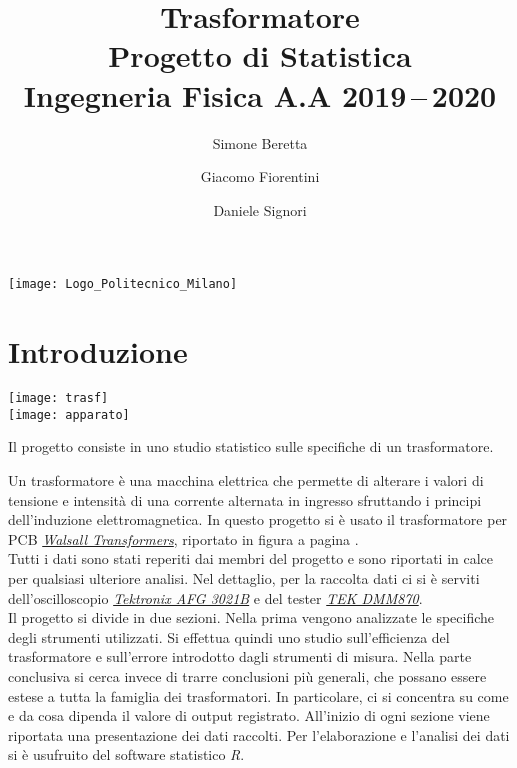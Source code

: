 \documentclass[a4paper]{article}
\begin{document}
	\title{\textbf{\Huge{Trasformatore}} \\ \bigskip \large{Progetto di Statistica} \\ \large{Ingegneria Fisica A.A 2019\,--\,2020}}
	
	\author{Simone Beretta \and Giacomo Fiorentini \and Daniele Signori} 
	\date{}
	
	\maketitle
		\begin{center}
		\texttt{[image: Logo\_Politecnico\_Milano]} \\
	\end{center}
	\tableofcontents
	\newpage
	
	\section{Introduzione}
	\medskip 
	\bigskip
\begin{center}
	
	\texttt{[image: trasf]} \label{trasf}
	\bigskip \\
	\medskip
	\texttt{[image: apparato]} 	
\end{center}
\bigskip
\bigskip \bigskip \bigskip
\bigskip
Il progetto consiste in uno studio statistico sulle specifiche di un trasformatore. 

Un trasformatore è una macchina elettrica che permette di alterare i valori di tensione e intensità di una corrente alternata in ingresso sfruttando i principi dell’induzione elettromagnetica. In questo progetto si è usato il trasformatore per PCB \href{https://www.wic-ltd.com/images/pdf/PCB_Transformer-Open_UK.pdf}{\emph{Walsall Transformers}}, riportato in figura a pagina \pageref{trasf}. 
\newline \\
Tutti i dati sono stati reperiti dai membri del progetto e sono riportati in calce per qualsiasi ulteriore analisi. Nel dettaglio, per la raccolta dati ci si è serviti dell’oscilloscopio \href{https://uk.tek.com/signal-generator/afg3000-function-generator}{\emph{Tektronix AFG 3021B}} e del tester \href{https://www.manualslib.com/products/Tektronix-Dmm870-8936646.html}{\emph{TEK DMM870}}.
\newline \\	
Il progetto si divide in due sezioni. Nella prima vengono analizzate le specifiche degli strumenti utilizzati. Si effettua quindi uno studio sull’efficienza del trasformatore e sull’errore introdotto dagli strumenti di misura. Nella parte conclusiva si cerca invece di trarre conclusioni più generali, che possano essere estese a tutta la famiglia dei trasformatori. In particolare, ci si concentra su come e da cosa dipenda il valore di output registrato. All’inizio di ogni sezione viene riportata una presentazione dei dati raccolti.
Per l’elaborazione e l’analisi dei dati si è usufruito del software statistico \emph{R}.	
	
\end{document}
